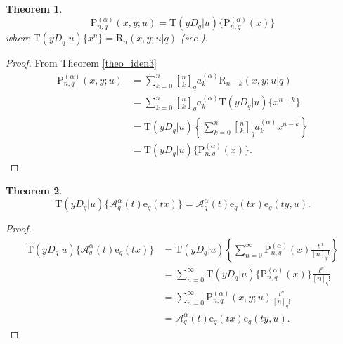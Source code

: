 \documentclass[12pt]{article}
\newcommand{\qbinom}{\genfrac{[}{]}{0pt}{}}
\newcommand{\e}{\mathrm{e}}
\newcommand{\A}{\mathcal{A}}
\newcommand{\p}{\mathrm{P}}
\newcommand{\rr}{\mathrm{R}}
\newcommand{\T}{\mathrm{T}}
\newtheorem{theorem}{Theorem}
\begin{document}
\begin{theorem}\label{theo_iden4}
    \begin{equation}
        \p_{n,q}^{(\alpha)}(x,y;u)=\T(yD_{q}|u)\{\p_{n,q}^{(\alpha)}(x)\}
    \end{equation}
where $\T(yD_{q}|u)\{x^n\}=\rr_{n}(x,y;u|q)$ (see \cite{orozco}).    
\end{theorem}
\begin{proof}
From Theorem \ref{theo_iden3}
    \begin{align*}
        \p_{n,q}^{(\alpha)}(x,y;u)&=\sum_{k=0}^{n}\qbinom{n}{k}_{q}a_{k}^{(\alpha)}\rr_{n-k}(x,y;u|q)\\
        &=\sum_{k=0}^{n}\qbinom{n}{k}_{q}a_{k}^{(\alpha)}\T(yD_{q}|u)\{x^{n-k}\}\\
        &=\T(yD_{q}|u)\left\{\sum_{k=0}^{n}\qbinom{n}{k}_{q}a_{k}^{(\alpha)}x^{n-k}\right\}\\
        &=\T(yD_{q}|u)\{\p_{n,q}^{(\alpha)}(x)\}.
    \end{align*}
\end{proof}

\begin{theorem}\label{theo_iden5}
    \begin{equation}
        \T(yD_{q}|u)\{\A_{q}^{\alpha}(t)\e_{q}(tx)\}=\A_{q}^{\alpha}(t)\e_{q}(tx)\e_{q}(ty,u).
    \end{equation}
\end{theorem}
\begin{proof}
    \begin{align*}
        \T(yD_{q}|u)\{\A_{q}^{\alpha}(t)\e_{q}(tx)\}&=\T(yD_{q}|u)\left\{\sum_{n=0}^{\infty}\p_{n,q}^{(\alpha)}(x)\frac{t^n}{[n]_{q}!}\right\}\\
        &=\sum_{n=0}^{\infty}\T(yD_{q}|u)\{\p_{n,q}^{(\alpha)}(x)\}\frac{t^n}{[n]_{q}!}\\
        &=\sum_{n=0}^{\infty}\p_{n,q}^{(\alpha)}(x,y;u)\frac{t^n}{[n]_{q}!}\\
        &=\A_{q}^{\alpha}(t)\e_{q}(tx)\e_{q}(ty,u).
    \end{align*}
\end{proof}
\end{document}
